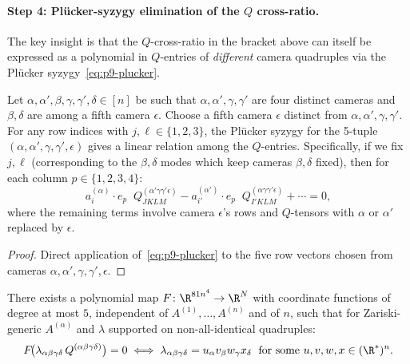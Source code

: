 \paragraph{Step 4: Pl\"ucker-syzygy elimination of the $Q$ cross-ratio.}

The key insight is that the $Q$-cross-ratio in the bracket above can itself
be expressed as a polynomial in $Q$-entries of \emph{different} camera quadruples
via the Pl\"ucker syzygy~\eqref{eq:p9-plucker}.

\begin{lemma}\label{lem:p9-crossratio}
Let $\alpha,\alpha',\beta,\gamma,\gamma',\delta\in[n]$ be such that
$\alpha,\alpha',\gamma,\gamma'$ are four distinct cameras and $\beta,\delta$ are
among a fifth camera $\epsilon$. Choose a fifth camera $\epsilon$ distinct from
$\alpha,\alpha',\gamma,\gamma'$. For any row indices with $j,\ell\in\{1,2,3\}$,
the Pl\"ucker syzygy for the 5-tuple $(\alpha,\alpha',\gamma,\gamma',\epsilon)$
gives a linear relation among the $Q$-entries. Specifically, if we fix $j,\ell$
(corresponding to the $\beta,\delta$ modes which keep cameras $\beta,\delta$ fixed),
then for each column $p\in\{1,2,3,4\}$:
\begin{equation}\label{eq:p9-crossratio-elim}
  a^{(\alpha)}_i\cdot e_p\;\; Q^{(\alpha'\gamma\gamma'\epsilon)}_{JKLM}
  - a^{(\alpha')}_{i'}\cdot e_p\;\; Q^{(\alpha\gamma\gamma'\epsilon)}_{I'KLM}
  + \cdots = 0,
\end{equation}
where the remaining terms involve camera $\epsilon$'s rows and $Q$-tensors
with $\alpha$ or $\alpha'$ replaced by $\epsilon$.
\end{lemma}

\begin{proof}
Direct application of~\eqref{eq:p9-plucker} to the five row vectors chosen from cameras
$\alpha,\alpha',\gamma,\gamma',\epsilon$.
\end{proof}

\begin{theorem}\label{thm:p9-main}
There exists a polynomial map $F\colon \R^{81n^4}\to\R^N$ with coordinate
functions of degree at most $5$, independent of $A^{(1)},\ldots,A^{(n)}$
and of $n$, such that for Zariski-generic $A^{(\alpha)}$ and $\lambda$
supported on non-all-identical quadruples:
\[
  F\!\bigl(\lambda_{\alpha\beta\gamma\delta}\,Q^{(\alpha\beta\gamma\delta)}\bigr) = 0
  \;\Longleftrightarrow\;
  \lambda_{\alpha\beta\gamma\delta} = u_\alpha v_\beta w_\gamma x_\delta
  \;\text{ for some } u,v,w,x\in(\R^*)^n.
\]
\end{theorem}

